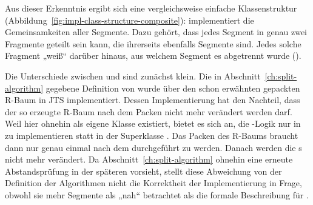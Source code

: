 \documentclass[../main/thesis.tex]{subfiles}
\begin{document}

Aus dieser Erkenntnis ergibt sich eine vergleichsweise einfache Klassenstruktur (Abbildung~\ref{fig:impl-class-structure-composite}):
 implementiert die Gemeinsamkeiten aller Segmente.
Dazu gehört, dass jedes Segment in genau zwei Fragmente geteilt sein kann, die ihrerseits ebenfalls Segmente sind.
Jedes solche Fragment „weiß“ darüber hinaus, aus welchem Segment es abgetrennt wurde ().



Die Unterschiede zwischen  und  sind zunächst klein.
Die in Abschnitt~\ref{ch:split-algorithm} gegebene Definition von  wurde über den schon erwähnten gepackten R-Baum in JTS implementiert.
Dessen Implementierung hat den Nachteil, dass der so erzeugte R-Baum nach dem Packen nicht mehr verändert werden darf.
Weil hier ohnehin  als eigene Klasse existiert, bietet es sich an, die -Logik nur in  zu implementieren statt in der Superklasse .
Das Packen des R-Baums braucht dann nur genau einmal nach dem  durchgeführt zu werden.
Danach werden die s nicht mehr verändert.
Da Abschnitt~\ref{ch:split-algorithm} ohnehin eine erneute Abstandsprüfung in der späteren  vorsieht, stellt diese Abweichung von der Definition der Algorithmen nicht die Korrektheit der Implementierung in Frage, obwohl sie mehr Segmente als „nah“ betrachtet als die formale Beschreibung für .
\end{document}
